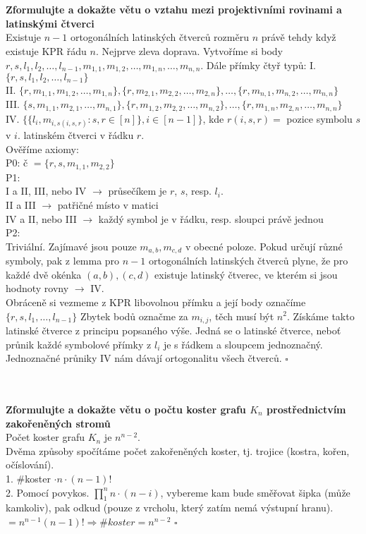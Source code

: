 \documentclass[a4paper]{article}
\newcommand{\led}{\hspace{0.2cm}$\square$}
\newcommand{\hlava}[1]{\text{} \\ \text{} \\ \text{} \hspace{-0.27cm} \textbf{#1} \\}
\begin{document}
\hlava{Zformulujte a dokažte větu o vztahu mezi projektivními rovinami a latinskými čtverci}
Existuje $n-1$ ortogonálních latinských čtverců rozměru $n$ právě tehdy když existuje KPR řádu $n$.
Nejprve zleva doprava. Vytvoříme si body $r, s, l_1, l_2, \dots, l_{n-1}, m_{1,1}, m_{1,2}, \dots, m_{1,n}, \dots, m_{n,n}$. Dále přímky čtyř typů:
I. $\{r, s, l_1, l_2, \dots, l_{n-1}\}$ \\
II. $\{r, m_{1,1}, m_{1,2}, \dots, m_{1,n} \}, \{r, m_{2,1}, m_{2,2}, \dots, m_{2,n} \}, \dots, \{r, m_{n,1}, m_{n,2}, \dots, m_{n,n} \}$ \\
III. $\{s, m_{1,1}, m_{2,1}, \dots, m_{n,1} \}, \{r, m_{1,2}, m_{2,2}, \dots, m_{n,2} \}, \dots, \{r, m_{1,n}, m_{2,n}, \dots, m_{n,n} \}$ \\
IV. $\{\{l_i, m_{i,s(i,s,r)}: s,r \in [n] \}, i \in [n-1] \}$, kde $r(i, s, r) = $ pozice symbolu $s$ v $i.$ latinském čtverci v řádku $r$. \\
Ověříme axiomy: \\
P0: č $= \{r, s, m_{1,1}, m_{2,2}\}$ \\
P1: \\ 
I a II, III, nebo IV $\rightarrow$ průsečíkem je $r$, $s$, resp. $l_i$. \\
II a III $\rightarrow$ patřičné místo v matici \\
IV a II, nebo III $\rightarrow$ každý symbol je v řádku, resp. sloupci právě jednou \\
P2: \\
Triviální. Zajímavé jsou pouze $m_{a,b}, m_{c,d}$ v obecné poloze. Pokud určují různé symboly, pak z lemma pro $n-1$ ortogonálních latinských čtverců plyne, že pro každé dvě okénka $(a,b), (c,d)$ existuje latinský čtverec, ve kterém si jsou hodnoty rovny $\rightarrow$ IV. \\
Obráceně si vezmeme z KPR libovolnou přímku a její body označíme $\{ r, s, l_1, \dots, l_{n-1}\}$ Zbytek bodů označme za $m_{i,j}$, těch musí být $n^2$. Získáme takto latinské čtverce z principu popsaného výše. Jedná se o latinské čtverce, neboť průnik každé symbolové přímky z $l_i$ je s řádkem a sloupcem jednoznačný. Jednoznačné průniky IV nám dávají ortogonalitu všech čtverců. \led


\hlava{Zformulujte a dokažte větu o počtu koster grafu $K_n$ prostřednictvím zakořeněných stromů}
Počet koster grafu $K_n$ je $n^{n-2}$. \\
Dvěma způsoby spočítáme počet zakořeněných koster, tj. trojice (kostra, kořen, očíslování). \\
1. \#koster $\cdot n \cdot (n-1)!$  \\
2. Pomocí povykos. $\prod_1^n n \cdot (n-i)$, vybereme kam bude směřovat šipka (může kamkoliv), pak odkud (pouze z vrcholu, který zatím nemá výstupní hranu). $=n^{n-1} (n-1)! \Rightarrow \#koster = n^{n-2}$ \led
\end{document}
